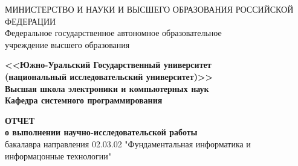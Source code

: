 \begin{titlepage}
    \begin{center}
        МИНИСТЕРСТВО И НАУКИ И ВЫСШЕГО ОБРАЗОВАНИЯ РОССИЙСКОЙ ФЕДЕРАЦИИ\\
        Федеральное государственное автономное образовательное\\
        учреждение высшего образования

        \textbf{
        <<Южно-Уральский Государственный университет\\
        (национальный исследовательский университет)>>\\
        Высшая школа электроники и компьютерных наук\\
        Кафедра системного программирования
        }
        \bigskip
        

        \vfill
        \large\textbf{
            ОТЧЕТ\\
            о выполнении научно-исследовательской работы
        }\\
        бакалавра направления 
        02.03.02 "Фундаментальная информатика и информацонные технологии"
        \bigskip
        

\end{center}
\end{titlepage}
